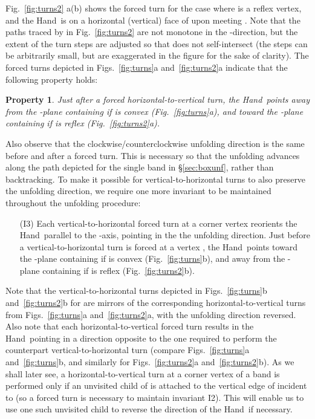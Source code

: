 \documentclass[11pt]{article}
\newcommand{\squeezelist}{\setlength{\itemsep}{0pt}}
\newtheorem{property}[theorem]{Property}
\newcommand\hand{{\sc Hand}}
\begin{document}
Fig.~\ref{fig:turns2} a(b) shows the forced turn for the case where  is a reflex vertex, and the \hand\ is on a horizontal (vertical) face of  upon meeting . Note that the paths traced by  in Fig.~\ref{fig:turns2} are not monotone in the -direction, but the extent of the turn steps are adjusted so that  does not self-intersect (the steps can be arbitrarily small, but are exaggerated in the figure for the sake of clarity).  The forced turns depicted in Figs.~\ref{fig:turns}a and~\ref{fig:turns2}a indicate that the following property holds:
\begin{property}
Just after a forced horizontal-to-vertical turn, the \hand\ points away from the -plane containing  if  is convex (Fig.~\ref{fig:turns}a), and toward the -plane containing  if  is reflex (Fig.~\ref{fig:turns2}a).
\end{property}
Also observe that the clockwise/counterclockwise unfolding direction is the same before and after a forced turn. This is necessary so that the unfolding advances along the path depicted for the single band in \S\ref{sec:boxunf}, rather than backtracking. To make it possible for vertical-to-horizontal turns to also preserve the unfolding direction, we require one more invariant to be maintained throughout the unfolding procedure:
\begin{enumerate}
\squeezelist
\item[(I3)] Each vertical-to-horizontal forced turn at a corner vertex  reorients the \hand\ parallel to the -axis, pointing in the the unfolding direction. Just before a vertical-to-horizontal turn is forced at a vertex , the \hand\ points toward the -plane containing  if  is convex (Fig.~\ref{fig:turns}b), and away from the -plane containing  if  is reflex (Fig.~\ref{fig:turns2}b).
\end{enumerate}
Note that the vertical-to-horizontal turns depicted in Figs.~\ref{fig:turns}b and~\ref{fig:turns2}b for  are mirrors of the corresponding horizontal-to-vertical turns from Figs.~\ref{fig:turns}a and~\ref{fig:turns2}a, with the unfolding direction reversed. 
Also note that each horizontal-to-vertical forced turn results in the \hand\ pointing in a direction opposite to the one required to 
perform the counterpart vertical-to-horizontal turn (compare Figs.~\ref{fig:turns}a and~\ref{fig:turns}b, and similarly for 
Figs.~\ref{fig:turns2}a and~\ref{fig:turns2}b). As we shall later see,
a horizontal-to-vertical turn at a corner vertex  of a band  is performed only if an unvisited
child of  is attached to the vertical edge  of  incident to  (so a forced turn is necessary to maintain invariant I2). This will enable us to use one such unvisited child to reverse the direction of the \hand\, if necessary. 
\end{document}
